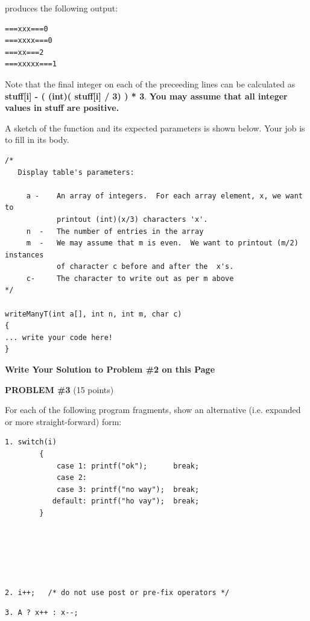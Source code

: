 produces the following output:  
\begin{verbatim}
===xxx===0
===xxxx===0
===xx===2
===xxxxx===1
\end{verbatim}

Note that the final integer on each of the preceeding lines can be calculated
as  {\bf stuff[i] - ( (int)( stuff[i] / 3) ) * 3}.  {\bf You may assume that
all integer values in stuff are positive.} 

A sketch of the function and its expected parameters is shown below.
Your job is to fill in its body.

\begin{verbatim}
/*
   Display table's parameters:

     a -    An array of integers.  For each array element, x, we want to 
            printout (int)(x/3) characters 'x'.
     n  -   The number of entries in the array
     m  -   We may assume that m is even.  We want to printout (m/2) instances 
            of character c before and after the  x's. 
     c-     The character to write out as per m above
*/

writeManyT(int a[], int n, int m, char c)
{
... write your code here!
}
\end{verbatim}

\pagebreak

{\bf Write Your Solution to Problem \#2 on this Page}


\newpage

{\bf PROBLEM \#3} (15 points)

For each of the following program fragments, show an alternative (i.e. expanded
or more straight-forward) form:
\begin{verbatim}
1. switch(i)
        {
            case 1: printf("ok");      break;
            case 2: 
            case 3: printf("no way");  break;
           default: printf("ho vay");  break;
        }






\end{verbatim}

\begin{verbatim}
2. i++;   /* do not use post or pre-fix operators */

\end{verbatim}

\begin{verbatim}
3. A ? x++ : x--;


\end{verbatim}

